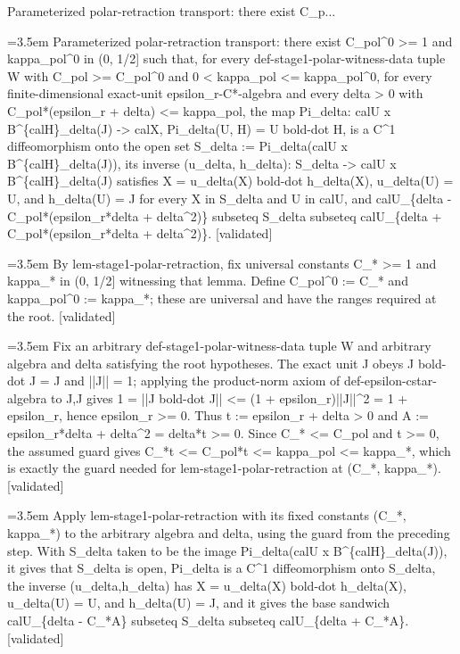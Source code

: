 \documentclass{article}
\newcommand{\step}[1]{\par\noindent\hangindent=3.5em\hangafter=1%
  \makebox[3.5em][l]{\textbf{#1.}}}
\newcommand{\steptag}[1]{\hfill{\small\textsf{[#1]}}}
\begin{document}
\begin{proofbox}{Parameterized polar-retraction transport: there exist C\_p...}
\step{1} Parameterized polar-retraction transport: there exist C\_pol\textasciicircum{}0 >= 1 and kappa\_pol\textasciicircum{}0 in (0, 1/2] such that, for every def-stage1-polar-witness-data tuple W with C\_pol >= C\_pol\textasciicircum{}0 and 0 < kappa\_pol <= kappa\_pol\textasciicircum{}0, for every finite-dimensional exact-unit epsilon\_r-C*-algebra and every delta > 0 with C\_pol*(epsilon\_r + delta) <= kappa\_pol, the map Pi\_delta: calU x B\textasciicircum{}\{calH\}\_delta(J) -> calX, Pi\_delta(U, H) = U bold-dot H, is a C\textasciicircum{}1 diffeomorphism onto the open set S\_delta := Pi\_delta(calU x B\textasciicircum{}\{calH\}\_delta(J)), its inverse (u\_delta, h\_delta): S\_delta -> calU x B\textasciicircum{}\{calH\}\_delta(J) satisfies X = u\_delta(X) bold-dot h\_delta(X), u\_delta(U) = U, and h\_delta(U) = J for every X in S\_delta and U in calU, and calU\_\{delta - C\_pol*(epsilon\_r*delta + delta\textasciicircum{}2)\} subseteq S\_delta subseteq calU\_\{delta + C\_pol*(epsilon\_r*delta + delta\textasciicircum{}2)\}. \steptag{validated} \\[6pt]
\step{1.1} By lem-stage1-polar-retraction, fix universal constants C\_* >= 1 and kappa\_* in (0, 1/2] witnessing that lemma. Define C\_pol\textasciicircum{}0 := C\_* and kappa\_pol\textasciicircum{}0 := kappa\_*; these are universal and have the ranges required at the root. \steptag{validated} \\[4pt]
\step{1.2} Fix an arbitrary def-stage1-polar-witness-data tuple W and arbitrary algebra and delta satisfying the root hypotheses. The exact unit J obeys J bold-dot J = J and ||J|| = 1; applying the product-norm axiom of def-epsilon-cstar-algebra to J,J gives 1 = ||J bold-dot J|| <= (1 + epsilon\_r)||J||\textasciicircum{}2 = 1 + epsilon\_r, hence epsilon\_r >= 0. Thus t := epsilon\_r + delta > 0 and A := epsilon\_r*delta + delta\textasciicircum{}2 = delta*t >= 0. Since C\_* <= C\_pol and t >= 0, the assumed guard gives C\_*t <= C\_pol*t <= kappa\_pol <= kappa\_*, which is exactly the guard needed for lem-stage1-polar-retraction at (C\_*, kappa\_*). \steptag{validated} \\[4pt]
\step{1.3} Apply lem-stage1-polar-retraction with its fixed constants (C\_*, kappa\_*) to the arbitrary algebra and delta, using the guard from the preceding step. With S\_delta taken to be the image Pi\_delta(calU x B\textasciicircum{}\{calH\}\_delta(J)), it gives that S\_delta is open, Pi\_delta is a C\textasciicircum{}1 diffeomorphism onto S\_delta, the inverse (u\_delta,h\_delta) has X = u\_delta(X) bold-dot h\_delta(X), u\_delta(U) = U, and h\_delta(U) = J, and it gives the base sandwich calU\_\{delta - C\_*A\} subseteq S\_delta subseteq calU\_\{delta + C\_*A\}. \steptag{validated} \\[4pt]

\end{proofbox}
\end{document}
